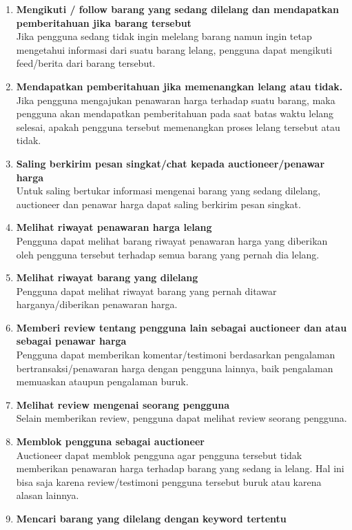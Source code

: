 \begin{enumerate}
    \item \textbf{Mengikuti / follow barang yang sedang dilelang dan mendapatkan pemberitahuan jika barang tersebut }\\
        Jika pengguna sedang tidak ingin melelang barang namun ingin tetap mengetahui informasi dari suatu barang lelang, pengguna dapat mengikuti feed/berita dari barang tersebut.
    \item \textbf{Mendapatkan pemberitahuan jika memenangkan lelang atau tidak.}\\
        Jika pengguna mengajukan penawaran harga terhadap suatu barang, maka pengguna akan mendapatkan pemberitahuan pada saat batas waktu lelang selesai, apakah pengguna tersebut memenangkan proses lelang tersebut atau tidak.
    \item \textbf{Saling berkirim pesan singkat/chat kepada auctioneer/penawar harga }\\
        Untuk saling bertukar informasi mengenai barang yang sedang dilelang, auctioneer dan penawar harga dapat saling berkirim pesan singkat.
    \item \textbf{Melihat riwayat penawaran harga lelang }\\
        Pengguna dapat melihat barang riwayat penawaran harga yang diberikan oleh pengguna tersebut terhadap semua barang yang pernah dia lelang.
    \item \textbf{Melihat riwayat barang yang dilelang }\\
        Pengguna dapat melihat riwayat barang yang pernah ditawar harganya/diberikan penawaran harga.
    \item \textbf{Memberi review tentang pengguna lain sebagai auctioneer dan atau sebagai penawar harga }\\
        Pengguna dapat memberikan komentar/testimoni berdasarkan pengalaman bertransaksi/penawaran harga dengan pengguna lainnya, baik pengalaman memuaskan ataupun pengalaman buruk.
    \item\textbf{ Melihat review mengenai seorang pengguna }\\
        Selain memberikan review, pengguna dapat melihat review seorang pengguna.
    \item \textbf{Memblok pengguna sebagai auctioneer }\\
        Auctioneer dapat memblok pengguna agar pengguna tersebut tidak memberikan penawaran harga terhadap barang yang sedang ia lelang. Hal ini bisa saja karena review/testimoni pengguna tersebut buruk atau karena alasan lainnya.
    \item \textbf{Mencari barang yang dilelang dengan keyword tertentu}
  \end{enumerate}
  
